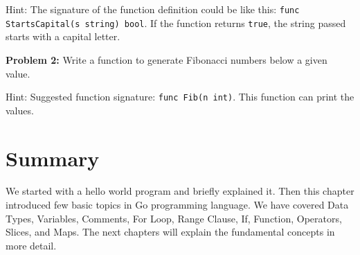 Hint: The signature of the function definition could be like this:
\texttt{func StartsCapital(s string) bool}.  If the function returns
\texttt{true}, the string passed starts with a capital letter.

\textbf{Problem 2:} Write a function to generate Fibonacci numbers below a
given value.

Hint: Suggested function signature: \texttt{func Fib(n int)}.  This
function can print the values.

\section*{Summary}

We started with a hello world program and briefly explained it.  Then
this chapter introduced few basic topics in Go programming language.
We have covered Data Types, Variables, Comments, For Loop, Range
Clause, If, Function, Operators, Slices, and Maps.  The next chapters
will explain the fundamental concepts in more detail.
